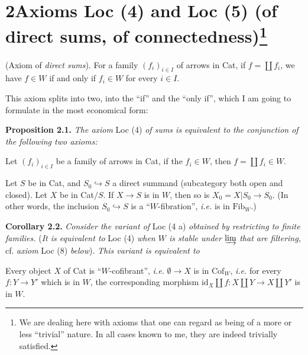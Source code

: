 \section*{2\quad Axioms Loc (4) and Loc (5) (of direct sums, of connectedness)\protect\footnote{We are dealing here with axioms that one can regard as being of a more or less ``trivial'' nature. In all cases known to me, they are indeed trivially satisfied.}}

\begin{description}[leftmargin=7em, labelwidth=6em]
\item[Loc (4)] (Axiom of \textit{direct sums}). For a family $(f_i)_{i\in I}$ of arrows in Cat, if $f = \coprod f_i$, we have $f \in W$ if and only if $f_i \in W$ for every $i \in I$.
\end{description}

This axiom splits into two, into the ``if'' and the ``only if'', which I am going to formulate in the most economical form:

\textbf{Proposition 2.1.} \textit{The axiom} Loc (4) \textit{of sums is equivalent to the conjunction of the following two axioms:}

\begin{description}[leftmargin=7em, labelwidth=6em]
\item[Loc (4 a)] Let $(f_i)_{i\in I}$ be a family of arrows in Cat, if the $f_i \in W$, then $f = \coprod f_i \in W$.
\item[Loc (4 b)] Let $S$ be in Cat, and $S_0 \hookrightarrow S$ a direct summand (subcategory both open and closed). Let $X$ be in Cat$/S$. If $X \longrightarrow S$ is in $W$, then so is $X_0 = X|S_0 \longrightarrow S_0$. (In other words, the inclusion $S_0 \hookrightarrow S$ is a ``$W$-fibration'', \textit{i.e.} is in $\mathrm{Fib}_W$.)
\end{description}

\textbf{Corollary 2.2.} \textit{Consider the variant of} Loc (4 a) \textit{obtained by restricting to finite families.} (\textit{It is equivalent to} Loc (4) \textit{when $W$ is stable under} $\varinjlim$ \textit{that are filtering,} cf. \textit{axiom} Loc (8) \textit{below}). \textit{This variant is equivalent to}

\begin{description}[leftmargin=7.5em, labelwidth=6.5em]
\item[Loc (4 a$_0$)] Every object $X$ of Cat is ``$W$-cofibrant'', \textit{i.e.} $\emptyset \longrightarrow X$ is in $\mathrm{Cof}_W$, \textit{i.e.} for every $f : Y \longrightarrow Y'$ which is in $W$, the corresponding morphism $\mathrm{id}_X \amalg f : X \amalg Y \longrightarrow X \amalg Y'$ is in $W$.
\end{description}

